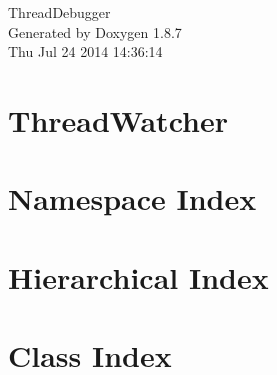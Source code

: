 \documentclass[twoside]{book}
\newcommand{\+}{\discretionary{\mbox{\scriptsize$\hookleftarrow$}}{}{}}
\newcommand{\clearemptydoublepage}{%
  \newpage{\pagestyle{empty}\cleardoublepage}%
}
\begin{document}
\hypersetup{pageanchor=false,
             bookmarks=true,
             bookmarksnumbered=true,
             pdfencoding=unicode
            }
\begin{titlepage}
\vspace*{7cm}
\begin{center}%
{\Large Thread\+Debugger }\\
\vspace*{1cm}
{\large Generated by Doxygen 1.8.7}\\
\vspace*{0.5cm}
{\small Thu Jul 24 2014 14:36:14}\\
\end{center}
\end{titlepage}
\clearemptydoublepage
\tableofcontents
\clearemptydoublepage
{}
\hypersetup{pageanchor=true}

\chapter{Thread\+Watcher}
\label{md__r_e_a_d_m_e}
\hypertarget{md__r_e_a_d_m_e}{}

\chapter{Namespace Index}

\chapter{Hierarchical Index}

\chapter{Class Index}

\end{document}
